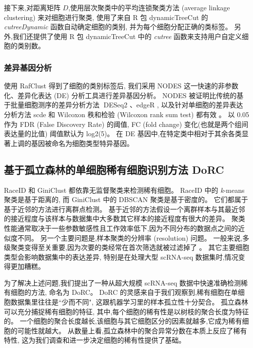 接下来,对距离矩阵 $D$,使用层次聚类中的平均连锁聚类方法 (average linkage clustering) 来对细胞进行聚类,
使用了来自 R 包 dynamicTreeCut \cite{langfelder2007defining,package-dynamicTreeCut} 的 \textit{cutreeDynamic} 函数自动确定细胞的类别,
并为每个细胞分配正确的类标签。
另外,我们还提供了使用 R 包 dynamicTreeCut 中的 \textit{cutree} 函数来支持用户自定义细胞的类别数。

\subsubsection{差异基因分析}
\label{subsec:de}

使用 RafClust 得到了细胞的类别标签后,
我们采用 NODES \cite{Sengupta049734} 这一快速的非参数化、差异化表达 (DE) 分析工具进行差异基因分析。
NODES 被证明比传统的基于批量细胞测序的差异分析方法 DESeq2 \cite{love2014moderated}、edgeR \cite{robinson2010edger},
以及针对单细胞的差异表达分析方法 scde \cite{kharchenko2014bayesian} 和 Wilcoxon 秩和检验 (Wilcoxon rank sum test) 都有效 \cite{Sengupta049734}。
以 0.05 作为 FDR (False Discovery Rate) 的阈值, FC (fold change) 变化(也就是两个组间表达量的比值) 阈值默认为 log2(5)。
在 DE 基因中,在特定类中相对于其余各类显著上调的基因被命名为细胞类型特异基因。


\subsection{基于孤立森林的单细胞稀有细胞识别方法 DoRC}
\label{sec:method}

RaceID 和 GiniClust 都依靠无监督聚类来检测稀有细胞。
RaceID 中的 \textit{k}-means 聚类是基于距离的,
而 GiniClust 中的 DBSCAN 聚类是基于密度的。
它们都属于基于近邻的方法进行离群点检测。
基于近邻的方法假设一个离群样本与其最近邻的接近程度与该样本与数据集中大多数其它样本的接近程度有很大的差异。
聚类性能通常取决于一些参数敏感性且工作效率低下,因为不同分布的数据点之间的近似度不同。
另一个主要问题是,样本聚类的分辨率 (resolution) 问题。
一般来说,多级聚类变得至关重要,因为次要的类经常在首次筛选就被过滤掉了 \cite{campbell2017molecular}。
其它主要细胞类型会影响数据集中的表达差异,
特别是在处理大型 scRNA-seq 数据集时,情况变得更加糟糕。

为了解决上述问题,我们提出了一种从超大规模 scRNA-seq 数据中快速准确检测稀有细胞的方法,
命名为 DoRC。
DoRC 的灵感来自于我们观察到,稀有细胞在单细胞数据集里往往是``少而不同", 这跟机器学习里的样本孤立性十分契合。
孤立森林可以充分捕捉稀有细胞的特征,
其中,每个细胞的稀有性是以树枝的聚合长度为特征的。
一个细胞的聚合长度越长,该细胞与其它细胞区分的因素就越多,它成为稀有细胞的可能性就越大。
从数量上看,孤立森林中的聚合异常分数在本质上反应了稀有特性,
这为我们调查和进一步决定细胞的稀有性提供了基础。


